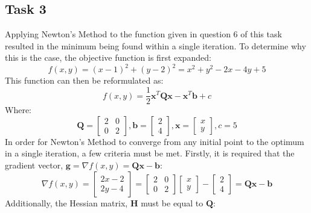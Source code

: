 \documentclass{article}
\begin{document}
\subsection{Task 3}
Applying Newton's Method to the function given in question 6 of this task resulted in the minimum being found within a single iteration. To determine why this is the case, the objective function is first expanded:
\begin{equation*}
    f(x,y) = (x-1)^{2} + (y-2)^{2} = x^{2} + y^{2} - 2x - 4y + 5
\end{equation*}
This function can then be reformulated as:
\begin{equation} \label{eq:task3}
    f(x,y) = \frac{1}{2}\mathbf{x}^{T}\mathbf{Qx}-\mathbf{x}^{T}\mathbf{b} + c
\end{equation}
Where:
\begin{equation*}
    \mathbf{Q} = \begin{bmatrix} 2 & 0 \\ 0 & 2 \end{bmatrix}, \mathbf{b} = \begin{bmatrix} 2 \\ 4\end{bmatrix}, \mathbf{x} = \begin{bmatrix} x \\ y \end{bmatrix}, c = 5
\end{equation*}
In order for Newton's Method to converge from any initial point to the optimum in a single iteration, a few criteria must be met. Firstly, it is required that the gradient vector, $\mathbf{g} = \nabla f(x,y) = \mathbf{Qx} - \mathbf{b}$:
\begin{equation*}
    \nabla f(x,y) = \begin{bmatrix} 2x - 2 \\ 2y - 4\end{bmatrix} = \begin{bmatrix} 2 & 0 \\ 0 & 2\end{bmatrix}\begin{bmatrix}x \\ y\end{bmatrix} - \begin{bmatrix} 2 \\ 4 \end{bmatrix}= \mathbf{Qx} - \mathbf{b}
\end{equation*}
\noindent Additionally, the Hessian matrix, $\mathbf{H}$ must be equal to $\mathbf{Q}$:
\end{document}
